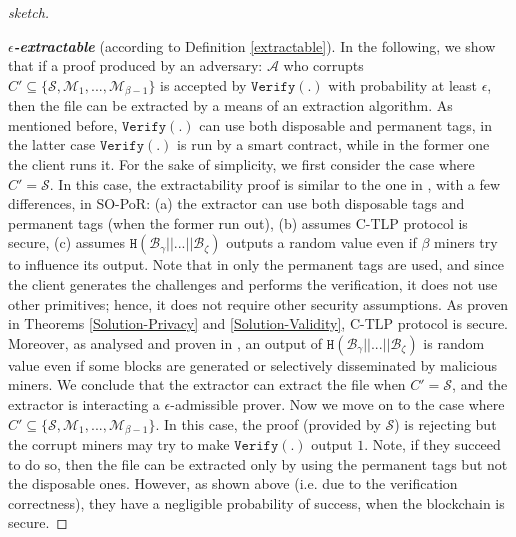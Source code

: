 \begin{proof}[sketch]
\

\noindent\textbf{\textit{$\epsilon$-extractable}} (according to Definition \ref{extractable}). In the following, we show that if   a proof produced by an adversary: $\mathcal{A}$ who corrupts $C'\subseteq\{\mathcal{S},\mathcal{M}_{\scriptscriptstyle 1},...,\mathcal{M}_{\scriptscriptstyle\beta-1}\}$ is accepted by $\mathtt{Verify(.)}$ with probability at least $\epsilon$, then the file can be extracted by a means of an extraction algorithm. As mentioned  before, $\mathtt{Verify(.)}$ can use both disposable and permanent tags, in the latter case $\mathtt{Verify(.)}$ is run by a smart contract, while in the former one the client runs it. For the sake of simplicity, we first consider the case where $C'=\mathcal{S}$. In this case, the extractability proof is similar to the one in \cite{DBLP:conf/asiacrypt/ShachamW08},  with a few differences, in SO-PoR: (a) the extractor can use both disposable tags and  permanent tags (when the former run out), (b) assumes  C-TLP protocol is secure, (c) assumes $\mathtt{H}( \mathcal {B}_{\scriptscriptstyle \gamma}||...||  \mathcal {B}_{\scriptscriptstyle \zeta})$ outputs a random value  even if $\beta$ miners try to influence its output. Note that in \cite{DBLP:conf/asiacrypt/ShachamW08} only the permanent tags are used, and since  the client generates the challenges and performs the verification, it does not use other primitives; hence, it does not require other security assumptions. As proven in  Theorems \ref{Solution-Privacy} and \ref{Solution-Validity}, C-TLP protocol is secure. Moreover, as  analysed and proven in \cite{DBLP:journals/iacr/AbadiCKZ19,armknecht2014outsourced}, an output of $\mathtt{H}( \mathcal {B}_{\scriptscriptstyle \gamma}||...||  \mathcal {B}_{\scriptscriptstyle \zeta})$ is random value even if some blocks are generated or selectively disseminated by malicious miners. We conclude that the extractor can extract the file when $C'=\mathcal{S}$, and  the extractor is interacting a  $\epsilon$-admissible prover. Now we move on to the case where $C'\subseteq\{\mathcal{S},\mathcal{M}_{\scriptscriptstyle 1},...,\mathcal{M}_{\scriptscriptstyle\beta-1}\}$. In this case, the proof (provided by $\mathcal{S}$) is rejecting but the corrupt miners may try to make $\mathtt{Verify}(.)$ output $1$. Note,  if they succeed to do so, then the file can be  extracted only by using the permanent tags but not the disposable ones. However, as shown above (i.e. due to the verification correctness), they have a negligible probability of success, when the blockchain is secure. 


\end{proof}
